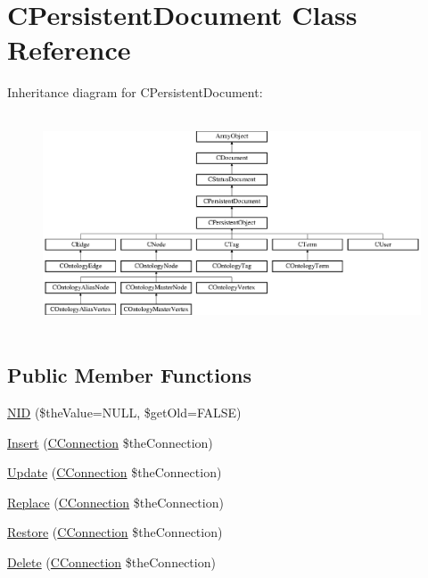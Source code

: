 \hypertarget{class_c_persistent_document}{\section{C\-Persistent\-Document Class Reference}
\label{class_c_persistent_document}
}
Inheritance diagram for C\-Persistent\-Document\-:\begin{figure}[H]
\begin{center}
\leavevmode
\includegraphics[height=6.461539cm]{class_c_persistent_document}
\end{center}
\end{figure}
\subsection*{Public Member Functions}
\begin{DoxyCompactItemize}
\item 
\hyperlink{class_c_persistent_document_ad9d15abc074aa3f779f214771b6123b0}{N\-I\-D} (\$the\-Value=N\-U\-L\-L, \$get\-Old=F\-A\-L\-S\-E)
\item 
\hyperlink{class_c_persistent_document_a3b3a1168053b14b065e11caad44dc971}{Insert} (\hyperlink{class_c_connection}{C\-Connection} \$the\-Connection)
\item 
\hyperlink{class_c_persistent_document_ae0435275b85d3d3fa6eb76711e0f0832}{Update} (\hyperlink{class_c_connection}{C\-Connection} \$the\-Connection)
\item 
\hyperlink{class_c_persistent_document_a1a3fb046a36fec064fca7cacdcc6cb3e}{Replace} (\hyperlink{class_c_connection}{C\-Connection} \$the\-Connection)
\item 
\hyperlink{class_c_persistent_document_a19f7dbe659a1174d844799e403d1a678}{Restore} (\hyperlink{class_c_connection}{C\-Connection} \$the\-Connection)
\item 
\hyperlink{class_c_persistent_document_a7ea1235ae140507d9fc0f94b6060540c}{Delete} (\hyperlink{class_c_connection}{C\-Connection} \$the\-Connection)
\end{DoxyCompactItemize}
